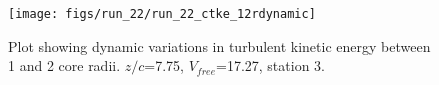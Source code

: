 \begin{figure}[H]
\centering
\texttt{[image: figs/run\_22/run\_22\_ctke\_12rdynamic]}
\caption{Plot showing dynamic variations in turbulent kinetic energy between 1 and 2 core radii. $z/c$=7.75, $V_{free}$=17.27, station 3.}
\label{fig:run_22_ctke_12rdynamic}
\end{figure}


